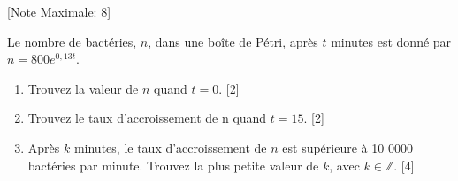 \begin{question}
  \hspace*{\fill} [Note Maximale: 8]\par
  \medskip
  \noindent Le nombre de bactéries, $n$, dans une boîte de Pétri, après $t$ minutes est donné par $n = 800e^{0,13t}$. \par
  \medskip
  \begin{enumerate}[label=(\alph*)]
    \item Trouvez la valeur de $n$ quand $t = 0$.\hspace*{\fill} [2]
    \item Trouvez le taux d'accroissement de n quand $t = 15$.\hspace*{\fill} [2]
    \item Après $k$ minutes, le taux d'accroissement de $n$ est supérieure à 10 0000 bactéries par minute.  Trouvez la plus petite valeur de $k$, avec $k \in \mathbb{Z}$.\hspace*{\fill} [4]
  \end{enumerate}
\end{question}
